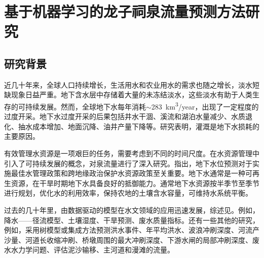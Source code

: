 \chapter{基于机器学习的龙子祠泉流量预测方法研究}\label{chap:ml_spring}

\section{研究背景}\label{sec:spr_background}

近几十年来，全球人口持续增长，生活用水和农业用水的需求也随之增长，淡水短缺现象日益严重\citep{portmann2010mirca2000,iglesias2015adaptation}。地下含水层中存储着大量的未冻结淡水，这些淡水有助于人类生存的可持续发展。然而，全球地下水每年消耗$\sim$\SI{283}{km^{3}/year}，出现了一定程度的过度开采\citep{wada2010global}。地下水过度开采的后果包括井水干涸、溪流和湖泊水量减少、水质退化、抽水成本增加、地面沉降、油井产量下降等\citep{bartolino2003ground,nayak2006groundwater}。\citet{dalin2017groundwater,butler2018sustainability}研究表明，灌溉是地下水损耗的主要原因。

有效管理水资源是一项艰巨的任务，需要考虑到不同的时间尺度\citep{galelli2010building}。\citet{kresic2009groundwater}在水资源管理中引入了可持续发展的概念，对泉流量进行了深入研究。\citet{coppola2003artificial}指出，地下水位预测对于实施最佳水管理政策和跨地缘政治保护水资源政策至关重要。地下水通常是一种可再生资源，在干旱时期地下水具备良好的抵御能力。通常地下水资源按半季节至季节进行规划，优化水的利用效率，保持农地的土壤含水容量，可维持水系统平衡。

过去的几十年里，由数据驱动的模型在水文领域的应用迅速发展，综述见\citep{abrahart2012two,deka2014support}。例如，降水——径流模型\citep{dibike2001model,solomatine2003model,granata2016support}、土壤湿度\citep{ahmad2010estimating}、干旱预测\citep{le2016meteorological}、废水质量指标\citep{granata2017machine}。还有一些其他的研究，例如，采用树模型或集成方法预测洪水事件\citep{solomatine2004m5}、年平均洪水\citep{singh2010estimation}、波浪冲刷深度\citep{etemad2011model}、河流产沙量\citep{goyal2014modeling}、河道长收缩冲刷\citep{najafzadeh2016scour}、桥墩周围的最大冲刷深度\citep{najafzadeh2016prediction}、下游水闸的局部冲刷深度\citep{najafzadeh2017prediction}、废水水力学问题\citep{granata2017machine}、评估泥沙输移\citep{najafzadeh2017application}、主河道和漫滩的流量\citep{zahiri2018optimized}。

